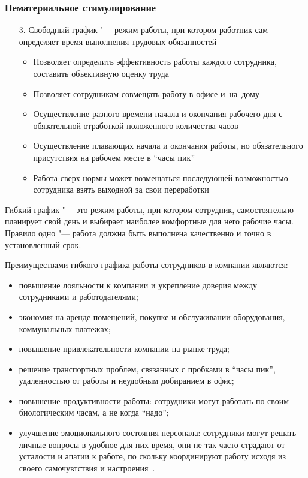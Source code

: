 \documentclass{../industrial-development}
\begin{document}


\begin{frame} \frametitle{Нематериальное стимулирование}
				  \begin{itemize}
					\item[3.] \alert{Свободный график} "--- режим работы, при котором работник сам определяет время выполнения трудовых обязанностей
			 \begin{itemize}
			\item Позволяет определить эффективность работы каждого сотрудника, составить объективную оценку труда
			\item Позволяет сотрудникам совмещать работу в офисе и~на~дому
			\item Осуществление разного времени начала и окончания рабочего дня с обязательной отработкой положенного количества часов
			\item Осуществление плавающих начала и окончания работы, но обязательного присутствия на рабочем месте в “часы пик”
			\item Работа сверх нормы может возмещаться последующей возможностью сотрудника взять выходной за свои переработки
			
  \end{itemize}

  \end{itemize}
		\end{frame}
		
		\lecturenotes
		
Гибкий график "--- это режим работы, при котором сотрудник, самостоятельно планирует свой день и выбирает наиболее комфортные для него рабочие часы. Правило одно "--- работа должна быть выполнена качественно и точно в установленный срок.
		
		Преимуществами гибкого графика работы сотрудников в компании являются:
		 \begin{itemize}
\item повышение лояльности к компании и укрепление доверия между сотрудниками и работодателями;

\item экономия на аренде помещений, покупке и обслуживании оборудования, коммунальных платежах;

\item повышение привлекательности компании на рынке труда;

\item решение транспортных проблем, связанных с пробками в “часы пик”, удаленностью от работы и неудобным добиранием в офис;

\item повышение продуктивности работы: сотрудники могут работать по своим биологическим часам, а не когда “надо”;

\item улучшение эмоционального состояния персонала: сотрудники могут решать личные вопросы в удобное для них время, они не так часто страдают от усталости и апатии к работе, по скольку координируют работу исходя из своего самочувтствия и настроения~\cite{Shabarshina}.
		  \end{itemize}
\end{document}
